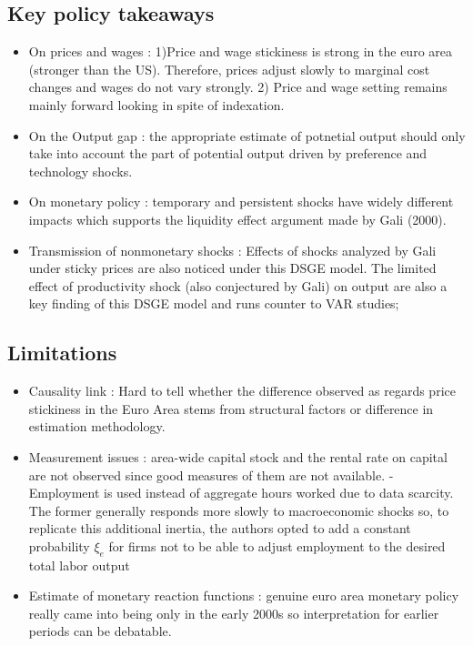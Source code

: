 \documentclass{article}
\begin{document}
\subsection{Key policy takeaways}
\begin{itemize}
    \item On prices and wages : 1)Price and wage stickiness is strong in the euro area (stronger than the US). Therefore, prices adjust slowly to marginal cost changes and wages do not vary strongly. 2) Price and wage setting remains mainly forward looking in spite of indexation. 
    \item On the Output gap : the appropriate estimate of potnetial output should only take into account the part of potential output driven by preference and technology shocks. 
    \item On monetary policy : temporary and persistent shocks have widely different impacts which supports the liquidity effect argument made by Gali (2000). 
    \item Transmission of nonmonetary shocks : Effects of shocks analyzed by Gali under sticky prices are also noticed under this DSGE model. The limited effect of productivity shock (also conjectured by Gali) on output are also a key finding of this DSGE model and runs counter to VAR studies; 

\end{itemize}

\subsection{Limitations}
\begin{itemize}
    \item Causality link : Hard to tell whether the difference observed as regards price stickiness in the Euro Area stems from structural factors or difference in estimation methodology. 
    \item Measurement issues : area-wide capital stock and  the rental rate on capital are not observed since good measures of them are not available. 
    \subitem - Employment is used instead of aggregate hours worked due to data scarcity. The former generally responds more slowly to macroeconomic shocks so, to replicate this additional inertia, the authors opted to add a constant probability $\xi_e$ for firms not to be able to adjust employment to the desired total labor output
    \item Estimate of monetary reaction functions : genuine euro area monetary policy really came into being only in the early 2000s so interpretation for earlier periods can be debatable. 
\end{itemize}
\end{document}
